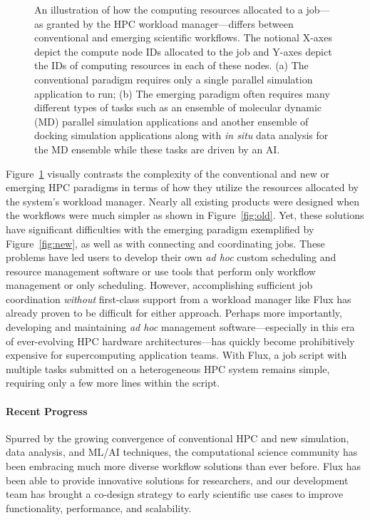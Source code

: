 \begin{figure}[ht]
{\begin{minipage}[c][1\width]{
            0.48\textwidth}
            \label{fig:new}
         \end{minipage}}
 \caption{An illustration of how the computing resources allocated
to a job---as granted by the HPC workload manager---differs between
conventional and emerging scientific workflows. The notional X-axes
depict the compute node IDs allocated to the job and Y-axes depict
the IDs of computing resources in each of these nodes. (a) The conventional paradigm
requires only a single parallel simulation application to run; (b) The emerging paradigm often requires many different types of tasks such as an ensemble of molecular dynamic (MD) parallel simulation applications and another ensemble of docking simulation applications along with {\em in situ} data analysis for the MD ensemble while these tasks are driven by an AI.}
 \label{fig:layout}
 \end{figure}
Figure~\ref{fig:layout} visually contrasts
the complexity of the conventional and
new or emerging HPC paradigms in terms of
how they utilize the resources allocated
by the system's workload manager.
Nearly all existing products were designed
when the workflows were much simpler
as shown in Figure~\ref{fig:old}.
Yet, these solutions have significant difficulties with
the emerging paradigm exemplified
by Figure~\ref{fig:new},
as well as with connecting and coordinating jobs.
These problems have led users to develop their own {\em ad hoc}
custom scheduling and resource management software or use tools
that perform only workflow management or only scheduling.
However, accomplishing sufficient job coordination {\em without}
first-class support from a workload manager
like Flux has already proven to be difficult
for either approach.
Perhaps more importantly, developing and maintaining {\em ad hoc} management
software---especially in this era of ever-evolving HPC hardware
architectures---has quickly become prohibitively expensive for
supercomputing application teams.
With Flux, a job script with multiple
tasks submitted on a heterogeneous HPC system
remains simple, requiring only a few more lines within
the script.


\paragraph{Recent Progress}
Spurred by the growing convergence of conventional HPC and new simulation,
data analysis, and ML/AI techniques, the computational science community
has been embracing much more diverse workflow solutions than ever before.
Flux has been able to provide innovative solutions for researchers,
and our development team has brought a co-design strategy to early
scientific use cases to improve functionality, performance, and scalability.

